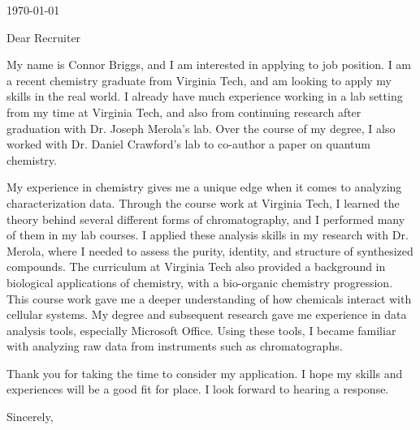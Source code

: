 \documentclass[12pt]{letter}
\begin{document}
\begin{letter}{\today}

  \opening{Dear Recruiter}

   My name is Connor Briggs, and I am interested in applying to {job position}. I am a recent chemistry graduate from Virginia Tech, and am looking to apply my skills in the real world. I already have much experience working in a lab setting from my time at Virginia Tech, and also from continuing research after graduation with Dr. Joseph Merola's lab. Over the course of my degree, I also worked with Dr. Daniel Crawford's lab to co-author a paper on quantum chemistry.
  
  
  My experience in chemistry gives me a unique edge when it comes to analyzing characterization data. Through the course work at Virginia Tech, I learned the theory behind several different forms of chromatography, and I performed many of them in my lab courses. I applied these analysis skills in my research with Dr. Merola, where I needed to assess the purity, identity, and structure of synthesized compounds. The curriculum at Virginia Tech also provided a background in biological applications of chemistry, with a bio-organic chemistry progression. This course work gave me a deeper understanding of how chemicals interact with cellular systems. My degree and subsequent research gave me experience in data analysis tools, especially Microsoft Office. Using these tools, I became familiar with analyzing raw data from instruments such as chromatographs.


  Thank you for taking the time to consider my application. I hope my skills and experiences will be a good fit for {place}. I look forward to hearing a response.
\closing{Sincerely,}
  
\end{letter}
\end{document}
